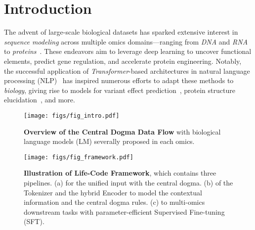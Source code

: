 \section{Introduction}
The advent of large-scale biological datasets has sparked extensive interest in \textit{sequence modeling} across multiple omics domains---ranging from \textit{DNA} and \textit{RNA} to \textit{proteins}~\cite{smith2023largescale, liwang2024protein,icml2024vqdna,liu2024genbench}. These endeavors aim to leverage deep learning to uncover functional elements, predict gene regulation, and accelerate protein engineering. Notably, the successful application of \textit{Transformer}-based architectures in natural language processing (NLP)~\cite{vaswani2017attention, devlin2019bert} has inspired numerous efforts to adapt these methods to \textit{biology}, giving rise to models for variant effect prediction~\cite{zhou2022transformer}, protein structure elucidation~\cite{jumper2021alphafold}, and more.



\begin{figure}[t]
    \vspace{-0.25em}
    \centering
    \texttt{[image: figs/fig\_intro.pdf]}
    \vspace{-2.25em}
    \caption{\textbf{Overview of the Central Dogma Data Flow} with biological language models (LM) severally proposed in each omics.
    }
    \label{fig:central_dogma}
    \vspace{-1.0em}
\end{figure}

\begin{figure*}[t!]
    \centering
    \texttt{[image: figs/fig\_framework.pdf]}
    \vspace{-2.25em}
    \caption{\textbf{Illustration of Life-Code Framework}, which contains three pipelines. (a)  for the unified input with the central dogma. (b)  of the Tokenizer and the hybrid Encoder to model the contextual information and the central dogma rules. (c)  to multi-omics downstream tasks with parameter-efficient Supervised Fine-tuning (SFT).
    }
    \label{fig:lcode_framework}
    \vspace{-1.0em}
\end{figure*}

